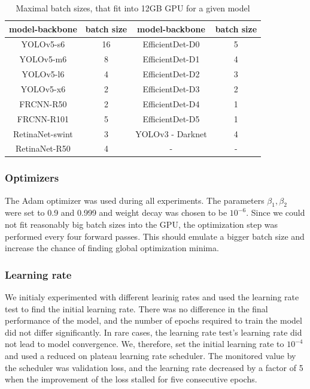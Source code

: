 \begin{table}
    \centering
    \begin{tabular}{|c|c|c|c|}
        \hline
        model-backbone  & batch size & model-backbone   & batch size \\ \hline
        YOLOv5-s6       & 16         & EfficientDet-D0  & 5          \\ \hline
        YOLOv5-m6       & 8          & EfficientDet-D1  & 4          \\ \hline
        YOLOv5-l6       & 4          & EfficientDet-D2  & 3          \\ \hline
        YOLOv5-x6       & 2          & EfficientDet-D3  & 2          \\ \hline
        FRCNN-R50       & 2          & EfficientDet-D4  & 1          \\ \hline
        FRCNN-R101      & 5          & EfficientDet-D5  & 1          \\ \hline
        RetinaNet-swint & 3          & YOLOv3 - Darknet & 4          \\ \hline
        RetinaNet-R50   & 4          & -                & -          \\ \hline
    \end{tabular}
    \caption{Maximal batch sizes, that fit into 12GB GPU for a given model}
    \label{tab:batch_sizes}
\end{table}



\subsubsection{Optimizers}
The Adam optimizer was used during all experiments. The parameters $\beta_1, \beta_2$ were set to 0.9 and 0.999 and weight decay was chosen to be $10^{-6}$. Since we could not fit reasonably big batch sizes into the GPU, the optimization step was performed every four forward passes. This should emulate a bigger batch size and increase the chance of finding global optimization minima.

\subsubsection{Learning rate}
We initialy experimented with different learinig rates and used the learning rate test to find the initial learning rate. There was no difference in the final performance of the model, and the number of epochs required to train the model did not differ significantly. In rare cases, the learning rate test's learning rate did not lead to model convergence. We, therefore, set the initial learning rate to $10^{-4}$ and used a reduced on plateau learning rate scheduler. The monitored value by the scheduler was validation loss, and the learning rate decreased by a factor of 5 when the improvement of the loss stalled for five consecutive epochs.
